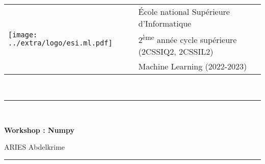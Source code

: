 \documentclass[11pt, a4paper]{article}
\begin{document}

\noindent
\begin{tabular}{ll}
\multirow{3}{*}{\texttt{[image: ../extra/logo/esi.ml.pdf]}} & \'Ecole national Supérieure d'Informatique\\
& 2\textsuperscript{ème} année cycle supérieure (2CSSIQ2, 2CSSIL2)\\
& Machine Learning (2022-2023)
\end{tabular}\\[.25cm]
\noindent\rule{\textwidth}{1pt}\\[-0.5cm]
\begin{center}
{\LARGE \textbf{Workshop : Numpy}}
\begin{flushright}
	ARIES Abdelkrime
\end{flushright}
\end{center}\vspace{-.25cm}
\noindent\rule{\textwidth}{1pt}

\end{document}

